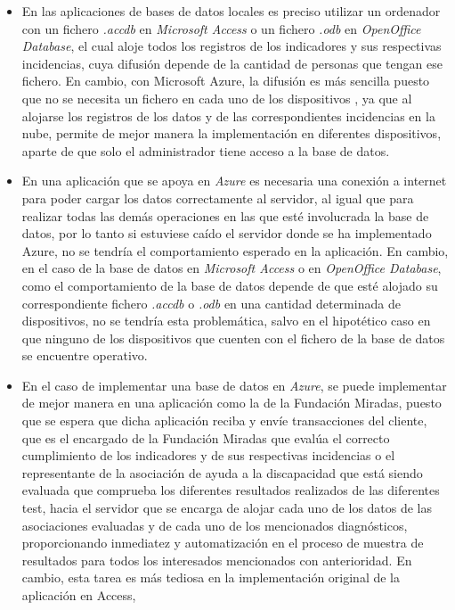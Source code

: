     \begin{itemize}
        \item En las aplicaciones de bases de datos locales es preciso utilizar un ordenador con un fichero \textit{.accdb} en \textit{Microsoft Access} o un fichero \textit{.odb} en 
        \textit{OpenOffice Database}, el cual aloje todos los registros de los indicadores y sus respectivas incidencias, 
        cuya difusión depende de la cantidad de personas que tengan ese fichero. En cambio, con Microsoft Azure, la difusión es más sencilla puesto que no se necesita un fichero en cada uno de los dispositivos 
        , ya que al alojarse los registros de los datos y de las correspondientes incidencias en la nube, permite de mejor manera la implementación en diferentes dispositivos, aparte de que solo el administrador 
        tiene acceso a la base de datos.
        \item En una aplicación que se apoya en \textit{Azure} es necesaria una conexión a internet para poder cargar los datos correctamente al servidor, al igual que para realizar todas las demás operaciones en las que 
        esté involucrada la base de datos, por lo tanto si estuviese caído el servidor donde se ha implementado Azure, no se tendría el comportamiento esperado en la aplicación.
        En cambio, en el caso de la base de datos en \textit{Microsoft Access} o en \textit{OpenOffice Database}, como el comportamiento de la base de datos depende de que esté alojado su correspondiente fichero 
        \textit{.accdb} o \textit{.odb} en una cantidad determinada de dispositivos, no se tendría esta problemática, salvo en el hipotético caso en que ninguno de los dispositivos que cuenten con el fichero de la 
        base de datos se encuentre operativo.
        \item En el caso de implementar una base de datos en  \textit{Azure}, se puede implementar de mejor manera en una aplicación como la de la Fundación Miradas, puesto que se espera que dicha aplicación reciba y envíe transacciones
        del cliente, que es el encargado de la Fundación Miradas que evalúa el correcto cumplimiento de los indicadores y de sus respectivas incidencias o el representante de la asociación de ayuda a la discapacidad que está siendo 
        evaluada que comprueba los diferentes resultados realizados de las diferentes test, hacia el servidor que se encarga de alojar cada uno de los datos de las asociaciones evaluadas y de cada uno de los mencionados diagnósticos,
        proporcionando inmediatez y automatización en el proceso de muestra de resultados para todos los interesados mencionados con anterioridad. En cambio, esta tarea es más tediosa en la implementación original de la aplicación en Access, 

\end{itemize}
